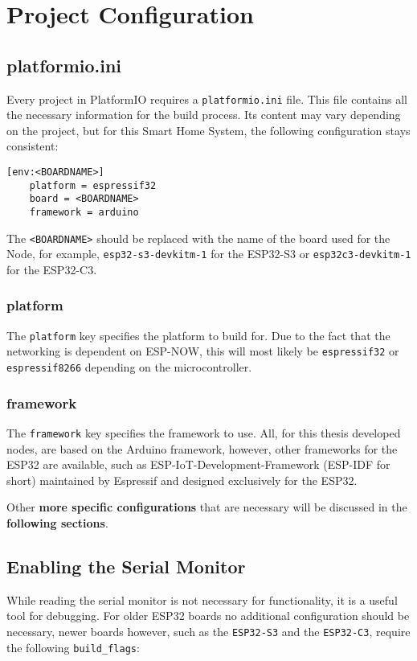 \section{Project Configuration}

    \subsection{platformio.ini}
    Every project in PlatformIO requires a \texttt{platformio.ini} file. This file
    contains all the necessary information for the build process. Its content may
    vary depending on the project, but for this Smart Home System, the following
    configuration stays consistent:

    \begin{verbatim}
[env:<BOARDNAME>]
    platform = espressif32
    board = <BOARDNAME>
    framework = arduino
    \end{verbatim}
    
    The \texttt{<BOARDNAME>} should be replaced with the name of the board used
    for the Node, for example, \texttt{esp32-s3-devkitm-1} for the ESP32-S3 or
    \texttt{esp32c3-devkitm-1} for the ESP32-C3.

        \subsubsection{platform}
        The \texttt{platform} key specifies the platform to build for. Due to the
        fact that the networking is dependent on ESP-NOW, this will most likely be
        \texttt{espressif32} or \texttt{espressif8266} depending on the 
        microcontroller.
        
        \subsubsection{framework}
        The \texttt{framework} key specifies the framework to use. All, for this 
        thesis developed nodes, are based on the Arduino framework, however, other
        frameworks for the ESP32 are available, such as ESP-IoT-Development-Framework
        (ESP-IDF for short) maintained by Espressif and designed exclusively for the 
        ESP32.
        
        Other \textbf{more specific 
        configurations} that are necessary will be discussed in the \textbf{following 
        sections}.

    \subsection{Enabling the Serial Monitor}
    While reading the serial monitor is not necessary for functionality, it is a
    useful tool for debugging. For older ESP32 boards no additional configuration 
    should be necessary, newer boards however, such as the \texttt{ESP32-S3} and the 
    \texttt{ESP32-C3}, require the following \texttt{build\_flags}: 
    
